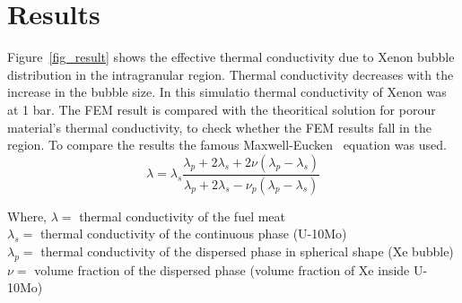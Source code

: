\section{Results}
\begin{doublespacing}
\iffalse
In this study, heat conduction simulations were used to study the impact of overall heat transfer coefficient in the presence of Xenon bubble in the intragranular and intergranular region. Grain boundary resistance and the influence of intergranular fission is not included in this calculation. This simulation is design to see the impact on heat transfer due to the formation of Gas Bubble Superlattice. Bubble superlattice formation inside U-Mo fuel stabilizes the fuel swelling behavior but heavily impacts the heat transfer capability~\cite{burkes2015thermal}. This might be due to Xenon's very low thermal conductivity. Thermal properties of Xenon was also considered in this work. Xenon's thermal conductivity is a function of both temperature and pressure~\cite{rabinovich1987thermophysical}. Since the size of the bubble changes with the burnup and fission density, thermal conductivity of the bubble also changes~\cite{miller2012advantages}. Pressure inside the bubble is highly depend on the curvature of the bubble. The reults is plotted in figure~\ref{fig_result}. As it can be seen from the plot that thermal conductivity of U-10Mo drops with the presence of the Xenon bubble. And with the increase of the Xenon bubble's size it also decreases. The result is also compared with Maxwell-Eucken equation~\cite{maxwell1881treatise} and with Hashin and Strikman~\cite{hashin1962variational}. In figure~\ref{fig_compare} the comparison is showed. 
\fi

Figure~\ref{fig_result} shows the effective thermal conductivity due to Xenon bubble distribution in the intragranular region. Thermal conductivity decreases with the increase in the bubble size. In this simulatio thermal conductivity of Xenon was at 1 bar. The FEM result is compared with the theoritical solution for porour material's thermal conductivity, to check whether the FEM results fall in the region. To compare the results the famous Maxwell-Eucken~\cite{maxwell1881treatise} equation was used. 
\begin{equation}
	\label{eq_MaxEuck}
	\lambda = \lambda_s\frac{\lambda_p+2\lambda_s+2\nu(\lambda_p-\lambda_s)}{\lambda_p+2\lambda_s-\nu_p(\lambda_p-\lambda_s)}
\end{equation}

\noindent Where, $\lambda = $ thermal conductivity of the fuel meat \\ 
		$\lambda_s = $ thermal conductivity of the continuous phase (U-10Mo) \\
		$\lambda_p = $ thermal conductivity of the dispersed phase in spherical shape (Xe bubble) \\
		$\nu = $ volume fraction of the dispersed phase (volume fraction of Xe inside U-10Mo) \\


\end{doublespacing}
